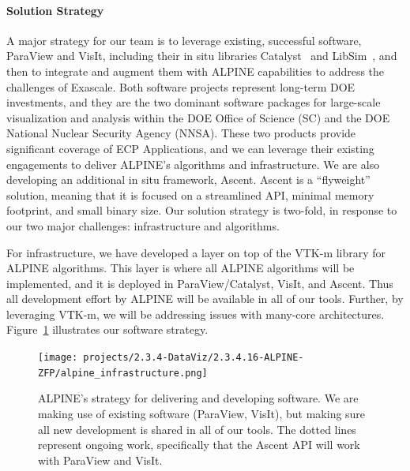 \paragraph{Solution Strategy}

A major strategy for our team is to leverage existing, successful software, ParaView and VisIt, including their  in situ libraries Catalyst~\cite{Catalyst} and LibSim~\cite{alpine:LibSim}, and then to integrate and augment them with ALPINE capabilities to address the challenges of Exascale. 
%
Both software projects represent long-term DOE investments, and they are the two dominant software packages for large-scale visualization and analysis within the DOE Office of Science (SC) and the DOE National Nuclear Security Agency (NNSA). 
These two products provide significant coverage of ECP Applications, and we can leverage their existing engagements to deliver ALPINE's algorithms and infrastructure. 
%
We are also developing an additional  in situ framework, Ascent.  Ascent is a ``flyweight'' solution, meaning that it is focused on a streamlined API, minimal memory footprint, and small binary size.
Our solution strategy is two-fold, in response to our two major challenges: infrastructure and algorithms.

For infrastructure, we have developed a layer on top of the VTK-m library for ALPINE algorithms.
This layer is where all ALPINE algorithms will be implemented, and it is deployed in ParaView/Catalyst, VisIt, and Ascent.
Thus all development effort by ALPINE will be available in all of our tools.
Further, by leveraging VTK-m, we will be addressing issues with many-core architectures.  
Figure~\ref{fig:alpine_infrastructure} illustrates our software strategy.

\begin{figure}[htb]
	\centering
	\texttt{[image: projects/2.3.4-DataViz/2.3.4.16-ALPINE-ZFP/alpine\_infrastructure.png]}
	\caption{\label{fig:alpine_infrastructure}ALPINE's strategy for delivering and developing software.  We are making use of existing software (ParaView, VisIt), but making sure all new development is shared in all of our tools.  The dotted lines represent ongoing work, specifically that the Ascent API will work with ParaView and VisIt.}
\end{figure}

